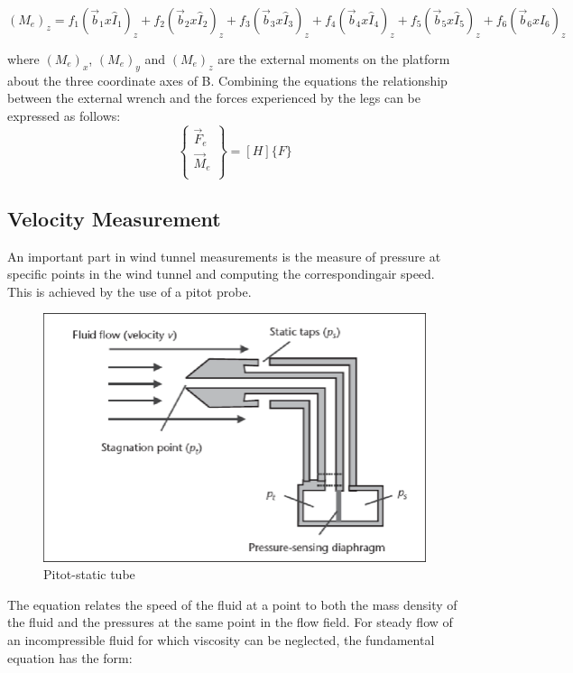 $(M_e)_z = f_1(\vec{b}_1 x \hat{I}_1)_z + f_2(\vec{b}_2 x \hat{I}_2)_z + f_3(\vec{b}_3 x \hat{I}_3)_z + f_4(\vec{b}_4 x \hat{I}_4)_z + f_5(\vec{b}_5 x \hat{I}_5)_z + f_6(\vec{b}_6 x \hat{I}_6)_z$

where $(M_e)_x$, $(M_e)_y$ and $(M_e)_z$ are the external moments on the platform  about the three coordinate axes of B. Combining the equations the relationship between the external wrench and the forces experienced by the legs can be expressed as follows:
$$
\begin{Bmatrix}
\vec{F}_e \\
\vec{M}_e \\
\end{Bmatrix} = [H]\{F\}
$$

\subsection{Velocity Measurement}
An important part in wind tunnel measurements is the measure of pressure at specific points in the wind tunnel and computing the correspondingair speed. This is achieved by the use of a pitot probe. 
\begin{center}
\begin{figure}
\centering
\includegraphics{Figures/pitot}
\caption[Pitot-static tube]{Pitot-static tube \cite{noauthor_wind_nodate}}
\end{figure}
\end{center}

The equation relates the speed of the fluid at a point to both the mass density of the fluid and the pressures at the same point in the flow field. For steady flow of an incompressible fluid for which viscosity can be neglected, the fundamental equation has the form:

